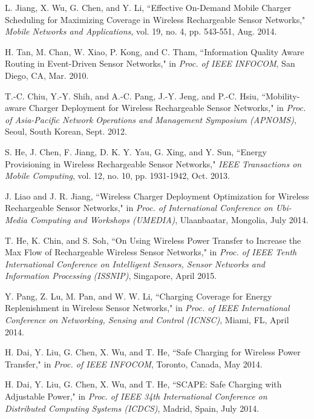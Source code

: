 \documentclass[twocolumn,10pt]{IEEEtran}
\begin{document}
\begin{thebibliography}{99}
L. Jiang, X. Wu, G. Chen, and Y. Li, ``Effective On-Demand Mobile Charger Scheduling for Maximizing Coverage in Wireless Rechargeable Sensor Networks," \emph{Mobile Networks and Applications}, vol. 19, no. 4, pp. 543-551, Aug. 2014. 
 
H. Tan, M. Chan, W. Xiao, P. Kong, and C. Tham, ``Information Quality Aware Routing in Event-Driven Sensor Networks," in \emph{Proc. of IEEE INFOCOM}, San Diego, CA, Mar. 2010. 
 

 







  
 
T.-C. Chiu, Y.-Y. Shih, and A.-C. Pang, J.-Y. Jeng, and P.-C. Hsiu, ``Mobility-aware Charger Deployment for Wireless Rechargeable Sensor Networks," in \emph{Proc. of Asia-Pacific Network Operations and Management Symposium (APNOMS)}, Seoul, South Korean, Sept. 2012.   
 
S. He, J. Chen, F. Jiang, D. K. Y. Yau, G. Xing, and Y. Sun, ``Energy Provisioning in Wireless Rechargeable Sensor Networks," \emph{IEEE Transactions on Mobile Computing},  vol. 12, no. 10, pp. 1931-1942, Oct. 2013.  


 
J. Liao and J. R. Jiang, ``Wireless Charger Deployment Optimization for Wireless Rechargeable Sensor Networks," in {\em Proc. of International Conference on Ubi-Media Computing and Workshops (UMEDIA)}, Ulaanbaatar, Mongolia, July 2014.  
 
 
T. He, K. Chin, and S. Soh,
``On Using Wireless Power Transfer to Increase the Max Flow of Rechargeable Wireless Sensor Networks," in \emph{Proc. of IEEE Tenth International Conference on Intelligent Sensors, Sensor Networks and Information Processing (ISSNIP)}, Singapore, April 2015. 
 
Y. Pang, Z. Lu, M. Pan, and W. W. Li, ``Charging Coverage for Energy Replenishment in Wireless Sensor Networks," in \emph{Proc. of IEEE International Conference on Networking, Sensing and Control (ICNSC)}, Miami, FL, April 2014.  
 
H. Dai, Y. Liu, G. Chen, X. Wu, and T. He, ``Safe Charging for Wireless Power Transfer," in \emph{Proc. of IEEE INFOCOM}, Toronto, Canada, May 2014. 

H. Dai, Y. Liu, G. Chen, X. Wu, and T. He, ``SCAPE: Safe Charging with Adjustable Power," in \emph{Proc. of IEEE 34th International Conference on Distributed Computing Systems (ICDCS)}, Madrid, Spain, July 2014. 


\end{thebibliography}
\end{document}
